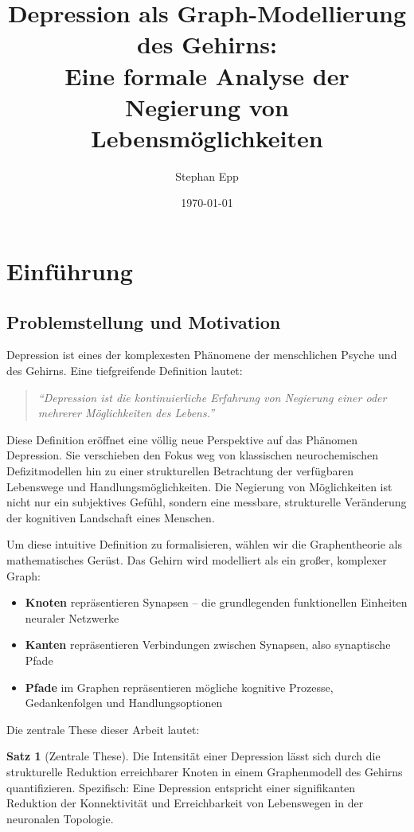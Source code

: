 \documentclass[a4paper,12pt]{article}
\title{Depression als Graph-Modellierung des Gehirns:\\Eine formale Analyse der Negierung von Lebensmöglichkeiten}
\author{Stephan Epp}
\date{\today}
\theoremstyle{definition}
\newtheorem{satz}{Satz}
\begin{document}
\maketitle

\tableofcontents
\newpage

\section{Einführung}

\subsection{Problemstellung und Motivation}

Depression ist eines der komplexesten Phänomene der menschlichen Psyche und des Gehirns. Eine tiefgreifende Definition lautet:

\begin{quote}
\textit{``Depression ist die kontinuierliche Erfahrung von Negierung einer oder mehrerer Möglichkeiten des Lebens.''} \cite{epp2026}
\end{quote}

Diese Definition eröffnet eine völlig neue Perspektive auf das Phänomen Depression. Sie verschieben den Fokus weg von klassischen neurochemischen Defizitmodellen hin zu einer strukturellen Betrachtung der verfügbaren Lebenswege und Handlungsmöglichkeiten. Die Negierung von Möglichkeiten ist nicht nur ein subjektives Gefühl, sondern eine messbare, strukturelle Veränderung der kognitiven Landschaft eines Menschen.

Um diese intuitive Definition zu formalisieren, wählen wir die Graphentheorie als mathematisches Gerüst. Das Gehirn wird modelliert als ein großer, komplexer Graph:

\begin{itemize}
	\item \textbf{Knoten} repräsentieren Synapsen -- die grundlegenden funktionellen Einheiten neuraler Netzwerke
	\item \textbf{Kanten} repräsentieren Verbindungen zwischen Synapsen, also synaptische Pfade
	\item \textbf{Pfade} im Graphen repräsentieren mögliche kognitive Prozesse, Gedankenfolgen und Handlungsoptionen
\end{itemize}

Die zentrale These dieser Arbeit lautet:

\begin{satz}[Zentrale These]
Die Intensität einer Depression lässt sich durch die strukturelle Reduktion erreichbarer Knoten in einem Graphenmodell des Gehirns quantifizieren. Spezifisch: Eine Depression entspricht einer signifikanten Reduktion der Konnektivität und Erreichbarkeit von Lebenswegen in der neuronalen Topologie.
\end{satz}
\end{document}

